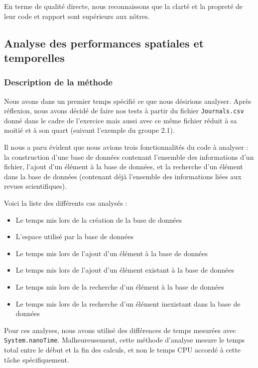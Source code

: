 \documentclass[a4paper,10pt]{article}
\begin{document}
	En terme de qualité directe, nous reconnaissons que la clarté et la propreté de leur code et rapport sont supérieurs aux nôtres.

\subsection{Analyse des performances spatiales et temporelles}

\subsubsection{Description de la méthode}

	Nous avons dans un premier temps spécifié ce que nous désirions analyser. Après réflexion, nous avons décidé de faire nos tests à partir du fichier \texttt{Journals.csv} donné dans le cadre de l'exercice mais aussi avec ce même fichier réduit à sa moitié et à son quart (suivant l'exemple du groupe 2.1). 
	
	Il nous a paru évident que nous avions trois fonctionnalités du code à analyser : la construction d'une base de données contenant l'ensemble des informations d'un fichier, l'ajout d'un élément à la base de données, et la recherche d'un élément dans la base de données (contenant déjà l'ensemble des informations liées aux revues scientifiques).

\vspace{0.35cm}
Voici la liste des différents cas analysés :

\begin{itemize}
\item Le temps mis lors de la création de la base de données
\item L'espace utilisé par la base de données
\item Le temps mis lors de l'ajout d'un élément à la base de données
\item Le temps mis lors de l'ajout d'un élément existant à la base de données
\item Le temps mis lors de la recherche d'un élément à la base de données
\item Le temps mis lors de la recherche d'un élément inexistant dans la base de données
\end{itemize}
 
	Pour ces analyses, nous avons utilisé des différences de temps mesurées avec \texttt{System.nanoTime}. Malheureusement, cette méthode d'analyse mesure le temps total entre le début et la fin des calculs, et non le temps CPU accordé à cette tâche spécifiquement. 
	
\end{document}
